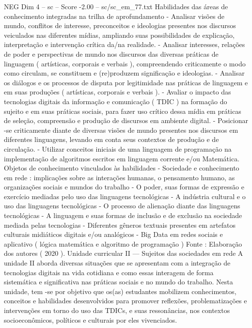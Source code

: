 \begin{textsample}{NEG Dim 4 – sc – Score -2.00 – sc/sc\_em\_77.txt}
Habilidades das áreas de conhecimento integradas na trilha de aprofundamento - Analisar visões de mundo, conflitos de interesse, preconceitos e ideologias presentes nos discursos veiculados nas diferentes mídias, ampliando suas possibilidades de explicação, interpretação e intervenção crítica da/na realidade. - Analisar interesses, relações de poder e perspectivas de mundo nos discursos das diversas práticas de linguagem ( artísticas, corporais e verbais ), compreendendo criticamente o modo como circulam, se constituem e (re)produzem significação e ideologias. - Analisar os diálogos e os processos de disputa por legitimidade nas práticas de linguagem e em suas produções ( artísticas, corporais e verbais ). - Avaliar o impacto das tecnologias digitais da informação e comunicação ( TDIC ) na formação do sujeito e em suas práticas sociais, para fazer uso crítico dessa mídia em práticas de seleção, compreensão e produção de discursos em ambiente digital. - Posicionar -se criticamente diante de diversas visões de mundo presentes nos discursos em diferentes linguagens, levando em conta seus contextos de produção e de circulação. - Utilizar conceitos iniciais de uma linguagem de programação na implementação de algoritmos escritos em linguagem corrente e/ou Matemática.
Objetos de conhecimento vinculados às habilidades - Sociedade e conhecimento em rede : implicações sobre as interações humanas, o pensamento humano, as organizações sociais e mundos do trabalho - O poder, suas formas de expressão e exercício mediadas pelo uso das linguagens tecnológicas - A indústria cultural e o uso das linguagens tecnológicas - O processo de alienação diante das linguagens tecnológicas - A linguagem e suas formas de inclusão e de exclusão na sociedade mediada pelas tecnologias - Diferentes gêneros textuais presentes em artefatos culturais midiáticos digitais e/ou analógicos - Big Data em redes sociais e aplicativo ( lógica matemática e algoritmo de programação ) Fonte : Elaboração dos autores ( 2020 ).
Unidade curricular II — Sujeitos das sociedades em rede A unidade II aborda diversas situações que se apresentam com a integração de tecnologias digitais na vida cotidiana e como essas interagem de forma sistemática e significativa nas práticas sociais e no mundo do trabalho.
Nesta unidade, tem -se por objetivo que os(as) estudantes mobilizem conhecimentos, conceitos e habilidades desenvolvidos para promover reflexões, problematizações e intervenções em torno do uso das TDICs, e suas ressonâncias, nos contextos socioeconômicos, políticos e culturais por eles vivenciados.

\end{textsample}
